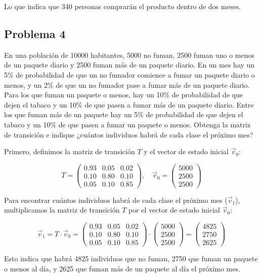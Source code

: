 \documentclass{article}
\begin{document}
Lo que indica que 340 personas comprarán el producto dentro de dos meses.


\subsection*{Problema 4}

En una población de 10000 habitantes, 5000 no fuman, 2500 fuman uno o menos de un paquete diario y 2500 fuman más de un paquete diario. En un mes hay un 5\% de probabilidad de que un no fumador comience a fumar un paquete diario o menos, y un 2\% de que un no fumador pase a fumar más de un paquete diario. Para los que fuman un paquete o menos, hay un 10\% de probabilidad de que dejen el tabaco y un 10\% de que pasen a fumar más de un paquete diario. Entre los que fuman más de un paquete hay un 5\% de probabilidad de que dejen el tabaco y un 10\% de que pasen a fumar un paquete o menos. Obtenga la matriz de transición e indique ¿cuántos individuos habrá de cada clase el próximo mes?

Primero, definimos la matriz de transición \(T\) y el vector de estado inicial \(\vec{v}_0\):

\[
    T = \begin{pmatrix}
        0.93 & 0.05 & 0.02 \\
        0.10 & 0.80 & 0.10 \\
        0.05 & 0.10 & 0.85
    \end{pmatrix},
    \quad
    \vec{v}_0 = \begin{pmatrix}
        5000 \\
        2500 \\
        2500
    \end{pmatrix}
\]

Para encontrar cuántos individuos habrá de cada clase el próximo mes (\(\vec{v}_1\)), multiplicamos la matriz de transición \(T\) por el vector de estado inicial \(\vec{v}_0\):

\[
    \vec{v}_1 = T \cdot \vec{v}_0 = \begin{pmatrix}
        0.93 & 0.05 & 0.02 \\
        0.10 & 0.80 & 0.10 \\
        0.05 & 0.10 & 0.85
    \end{pmatrix}
    \cdot
    \begin{pmatrix}
        5000 \\
        2500 \\
        2500
    \end{pmatrix}
    =
    \begin{pmatrix}
        4825 \\
        2750 \\
        2625
    \end{pmatrix}
\]

Esto indica que habrá 4825 individuos que no fuman, 2750 que fuman un paquete o menos al día, y 2625 que fuman más de un paquete al día el próximo mes.
\end{document}
